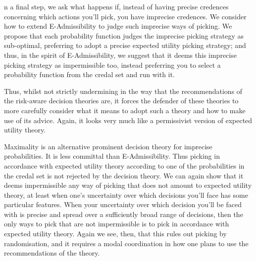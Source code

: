 \documentclass[a4paper]{article}
\renewcommand{\color}[1]{}
\newenvironment{colored}[1]{\leavevmode\color{#1}}{}
\newenvironment{CCM rewritten}
{\begingroup\color{blue}} %
{\endgroup}              %
\begin{document}
\begin{colored}
	 In a final step, we ask what happens if, instead of having precise credences concerning which actions you'll pick, you have imprecise credences. We consider how to extend E-Admissibility to judge such imprecise ways of picking.	 
	 We propose that each probability function judges the imprecise picking strategy as sub-optimal,
	  preferring to adopt a precise expected utility picking strategy; and thus, in the spirit of E-Admissibility, we suggest that it deems this imprecise picking strategy as impermissible too, instead preferring you to select a probability function from the credal set and run with it. 
	 
 	Thus, whilst not strictly undermining in the way that the recommendations of the risk-aware decision theories are, it forces the defender of these theories to more carefully consider what it means to adopt such a theory and how to make use of its advice. 
 	Again, it looks very much like a permissivist version of expected utility theory. 
	 
	 Maximality is an alternative prominent decision theory for imprecise probabilities. It is less committal than E-Admissibility. Thus picking in accordance with expected utility theory according to one of the probabilities in the credal set is not rejected by the decision theory. 
	 We can again show that it deems impermissible any way of picking that does not amount to expected utility theory, at least when one's uncertainty over which decisions you'll face has some particular features. When your uncertainty over which decision you'll be faced with is precise and spread over a sufficiently broad range of decisions, then the only ways to pick that are not impermissible is to pick in accordance with expected utility theory. Again we see, then, that this rules out picking by randomisation, and it requires a modal coordination in how one plans to use the recommendations of the theory. 
	 
	 
	 
	 
	 
	

\end{colored}
\end{document}
